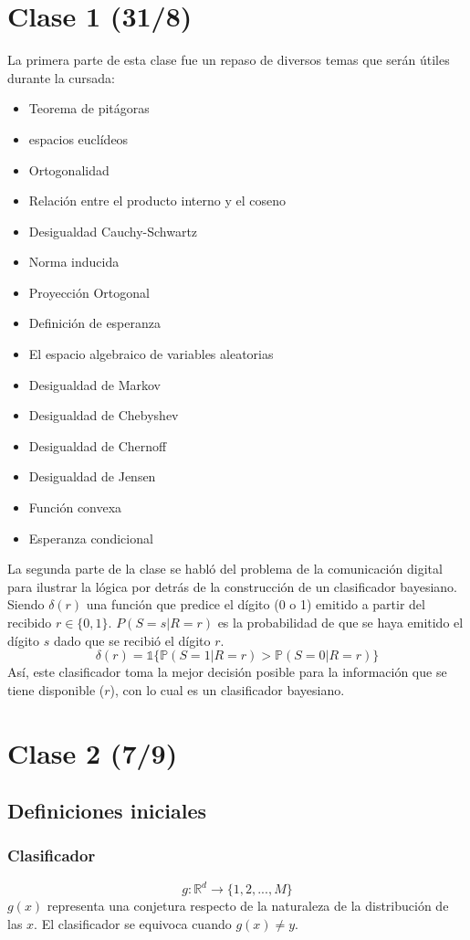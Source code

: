 \documentclass[12pt, a4paper]{article}
\begin{document}
\section{Clase 1 (31/8)}
La primera parte de esta clase fue un repaso de diversos temas que serán útiles durante la cursada:
\begin{itemize}
    \item Teorema de pitágoras
    \item espacios euclídeos
    \item Ortogonalidad
    \item Relación entre el producto interno y el coseno
    \item Desigualdad Cauchy-Schwartz
    \item Norma inducida
    \item Proyección Ortogonal
    \item Definición de esperanza
    \item El espacio algebraico de variables aleatorias
    \item Desigualdad de Markov
    \item Desigualdad de Chebyshev
    \item Desigualdad de Chernoff
    \item Desigualdad de Jensen
    \item Función convexa
    \item Esperanza condicional
\end{itemize}
La segunda parte de la clase se habló del problema de la comunicación digital para ilustrar la lógica por detrás de la construcción de un clasificador bayesiano.
Siendo $\delta(r)$ una función que predice el dígito (0 o 1) emitido a partir del recibido $r \in \{0,1\}$. $P(S=s|R=r)$ es la probabilidad de que se haya emitido el dígito $s$ dado que se recibió el dígito $r$.
$$\delta(r)=\mathds{1}\{\mathds{P}(S=1|R=r) > \mathds{P}(S=0|R=r)\}$$
Así, este clasificador toma la mejor decisión posible para la información que se tiene disponible ($r$), con lo cual es un clasificador bayesiano.

\section{Clase 2 (7/9)}
\subsection{Definiciones iniciales}
\subsubsection{Clasificador}
$$g:\mathds{R}^d\rightarrow\{ 1,2,...,M \}$$
$g(x)$ representa una conjetura respecto de la naturaleza de la distribución de las $x$. El clasificador se equivoca cuando $g(x) \neq y$.
\end{document}
